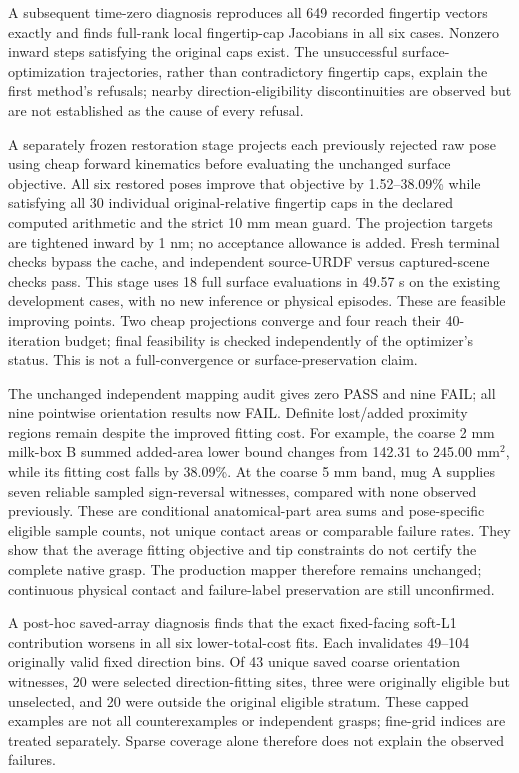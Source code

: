 \documentclass[10pt,letterpaper]{article}
\begin{document}
A subsequent time-zero diagnosis reproduces all 649 recorded fingertip vectors
exactly and finds full-rank local fingertip-cap Jacobians in all six cases.
Nonzero inward steps satisfying the original caps exist. The unsuccessful
surface-optimization trajectories, rather than contradictory fingertip caps,
explain the first method's refusals; nearby direction-eligibility discontinuities
are observed but are not established as the cause of every refusal.

A separately frozen restoration stage projects each previously rejected raw
pose using cheap forward kinematics before evaluating the unchanged surface
objective. All six restored poses improve that objective by 1.52--38.09\% while
satisfying all 30 individual original-relative fingertip caps in the declared
computed arithmetic and the strict 10 mm mean guard. The projection targets
are tightened inward by 1 nm; no acceptance allowance is added. Fresh terminal
checks bypass the cache, and independent source-URDF versus captured-scene
checks pass. This stage uses 18 full surface evaluations in 49.57 s on the
existing development cases, with no new inference or physical episodes. These
are feasible improving points. Two cheap projections converge and four reach
their 40-iteration budget; final feasibility is checked independently of the
optimizer's status. This is not a full-convergence or surface-preservation claim.

The unchanged independent mapping audit gives zero PASS and nine FAIL; all
nine pointwise orientation results now FAIL. Definite lost/added proximity
regions remain despite the improved fitting cost. For example, the coarse
2 mm milk-box B summed added-area lower bound changes from 142.31 to
245.00 mm$^2$, while its fitting cost falls by 38.09\%. At the coarse 5 mm
band, mug A supplies seven reliable sampled sign-reversal witnesses, compared
with none observed previously. These are conditional anatomical-part area
sums and pose-specific eligible sample counts, not unique contact areas or
comparable failure rates. They show that the average fitting objective and
tip constraints do not certify the complete native grasp. The production
mapper therefore remains unchanged; continuous physical contact and
failure-label preservation are still unconfirmed.

A post-hoc saved-array diagnosis finds that the exact fixed-facing soft-L1
contribution worsens in all six lower-total-cost fits. Each invalidates
49--104 originally valid fixed direction bins. Of 43 unique saved coarse
orientation witnesses, 20 were selected direction-fitting sites, three were
originally eligible but unselected, and 20 were outside the original eligible
stratum. These capped examples are not all counterexamples or independent
grasps; fine-grid indices are treated separately. Sparse coverage alone
therefore does not explain the observed failures.
\end{document}
